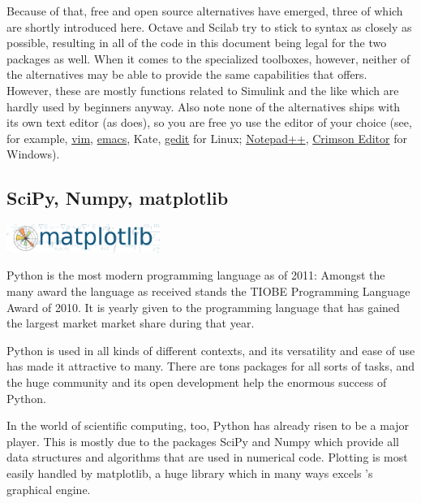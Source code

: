 Because of that, free and open source \matlab{} alternatives have emerged, three of which are shortly introduced here. Octave and Scilab try to stick to \matlab{} syntax as closely as possible, resulting in all of the code in this document being legal for the two packages as well.
When it comes to the specialized toolboxes, however, neither of the alternatives may be able to provide the same capabilities that \matlab{} offers. However, these are mostly functions related to Simulink and the like which are hardly used by beginners anyway.
Also note none of the alternatives ships with its own text editor (as \matlab{} does), so you are free yo use the editor of your choice (see, for example, \href{http://www.vim.org/}{vim}, \href{http://www.gnu.org/software/emacs/}{emacs}, Kate, \href{http://projects.gnome.org/gedit/}{gedit} for Linux; \href{http://notepad-plus.sourceforge.net/uk/site.htm}{Notepad++}, \href{http://www.crimsoneditor.com/}{Crimson Editor} for Windows).

\subsection{SciPy, Numpy, matplotlib}

\begin{floatingfigure}[r]{5cm}
\centering
\includegraphics[width=5cm]{figures/matplotlib.png}
\end{floatingfigure}

Python is the most modern programming language as of 2011: Amongst the many award the language as received stands the TIOBE Programming Language Award of 2010. It is yearly given to the programming language that has gained the largest market market share during that year.

Python is used in all kinds of different contexts, and its versatility and ease of use has made it attractive to many. There are tons packages for all sorts of tasks, and the huge community and its open development help the enormous success of Python.

In the world of scientific computing, too, Python has already risen to be a major player. This is mostly due to the packages SciPy and Numpy which provide all data structures and algorithms that are used in numerical code. Plotting is most easily handled by matplotlib, a huge library which in many ways excels \matlab{}'s graphical engine.

